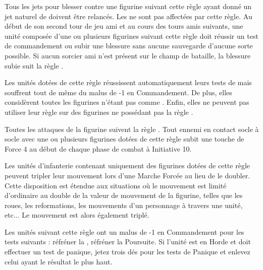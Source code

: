 

\vspace*{1.5cm}
\startarmyspecialrules

\armyspecialruleentry{\shacklesoffire{}}

Tous les jets pour blesser contre une figurine suivant cette règle ayant donné un jet naturel de  doivent être relancés. Les \magicalattacks{} ne sont pas affectées par cette règle.
Au début de son second tour de jeu ami et au cours des tours amis suivants, une unité composée d'une ou plusieurs figurines suivant cette règle doit réussir un test de commandement ou subir une blessure sans aucune sauvegarde d'aucune sorte possible. Si aucun sorcier ami n'est présent sur le champ de bataille, la blessure subie suit la règle .

\armyspecialruleentry{\chosenofashuruk{}}

Les unités dotées de cette règle réussissent automatiquement leurs tests de \fear{} mais souffrent tout de même du malus de -1 en Commandement. De plus, elles considèrent toutes les figurines n'étant pas \chosenofashuruk{} comme \insignificant{}. Enfin, elles ne peuvent pas utiliser leur règle \engineer{} sur des figurines ne possédant pas la règle \chosenofashuruk{}.

\armyspecialruleentry{\volcanicembrace{}}

Toutes les attaques de la figurine suivent la règle \flamingattacks. Tout ennemi en contact socle à socle avec une ou plusieurs figurines dotées de cette règle subit une touche de Force 4 au début de chaque phase de combat à Initiative 10.

\armyspecialruleentry{\relentless{}}

Les unités d'infanterie contenant uniquement des figurines dotées de cette règle peuvent tripler leur mouvement lors d'une Marche Forcée au lieu de le doubler. Cette disposition est étendue aux situations où le mouvement est limité d'ordinaire au double de la valeur de mouvement de la figurine, telles que les roues, les reformations, les mouvements d'un personnage à travers une unité, etc... Le mouvement est alors également triplé.

\armyspecialruleentry{\unruly{}}

Les unités suivant cette règle ont un malus de -1 en Commandement pour les tests suivants : réfréner la \frenzy{}, réfréner la Poursuite. Si l'unité est en Horde et doit effectuer un test de panique, jetez trois dés pour les tests de Panique et enlevez celui ayant le résultat le plus haut.

